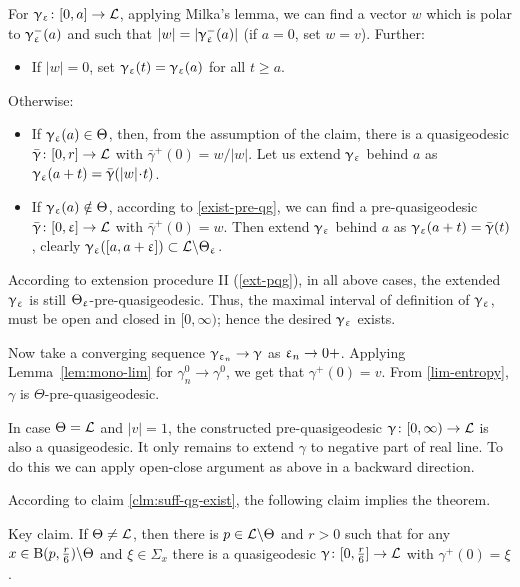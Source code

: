 For $\gamma_\eps\:[0,a]\to \spc{L}$, applying Milka's lemma, we can find a vector $w$ which is polar to $\upgamma_\upvarepsilon^-(a)$ and such that $|w|=|\upgamma_\upvarepsilon^-(a)|$ (if $a=0$, set $w=v$). 
Further:
\begin{itemize}
\item If $|w|=0$, set $\upgamma_\upvarepsilon(t)=\upgamma_\upvarepsilon(a)$ for all $t\ge a$. 
\end{itemize}
Otherwise:
\begin{itemize}
\item If $\gamma_\eps(a)\in\Theta$, then, from the assumption of the claim, there is a quasigeodesic $\bar\gamma\:[0,r]\to \spc{L}$ with $\bar\gamma^+(0)=w/|w|$.
Let us extend $\upgamma_\upvarepsilon$ behind $a$ as $\gamma_\eps(a+t)=\bar\gamma(|w|\cdot t)$.
\item If $\upgamma_\upvarepsilon(a)\notin\Theta$, according to \ref{exist-pre-qg},
we can find a pre-quasigeodesic $\bar\gamma\:[0,\eps]\to \spc{L}$ with $\bar\gamma^+(0)=w$.
Then extend $\upgamma_\upvarepsilon$ behind $a$ as $\upgamma_\upvarepsilon(a+t)=\bar{\upgamma}(t)$, clearly $\gamma_\eps([a,a+\eps])\subset \spc{L}\backslash\Theta_\eps$.
\end{itemize}
According to extension procedure II (\ref{ext-pqg}), in all above cases, the extended $\upgamma_\upvarepsilon$ is still $\Theta_\upvarepsilon$-pre-\nospace quasigeodesic.
Thus, the maximal interval of definition of $\upgamma_\upvarepsilon$, must be open and closed in $[0,\infty)$;
hence the desired $\upgamma_\upvarepsilon$ exists.

Now take a converging sequence $\gamma_{\eps_n}\to\gamma$ as $\eps_n\to0+$.
Applying Lemma~\ref{lem:mono-lim} for $\gamma_n^0\to\gamma^0$, we get that $\gamma^+(0)=v$.
From \ref{lim-entropy}, $\gamma$ is $\Theta$-pre-quasigeodesic.

In case $\Theta=\mathcal{L}$ and $|v|=1$, the constructed pre-quasigeodesic $\gamma\:[0,\infty)\to \spc{L}$
is also a quasigeodesic.
It only remains to extend $\gamma$ to negative part of real line.
To do this we can apply open-close argument as above in a backward direction.
\claimqeds

According to claim \ref{clm:suff-qg-exist}, the following claim implies the theorem.

\begin{clm}{Key claim.}\label{clm:qg-main}
If $\Theta\not=\mathcal{L}$, then there is $p\in \spc{L}\backslash \Theta$ and $r>0$ such that for any $x\in\oBall(p,\tfrac{r}{6})\backslash \Theta$ and $\xi\in \Sigma_x$ there is a quasigeodesic $\gamma\:[0,\tfrac{r}{6}]\to \spc{L}$ with  $\gamma^+(0)=\xi$.
\end{clm}


